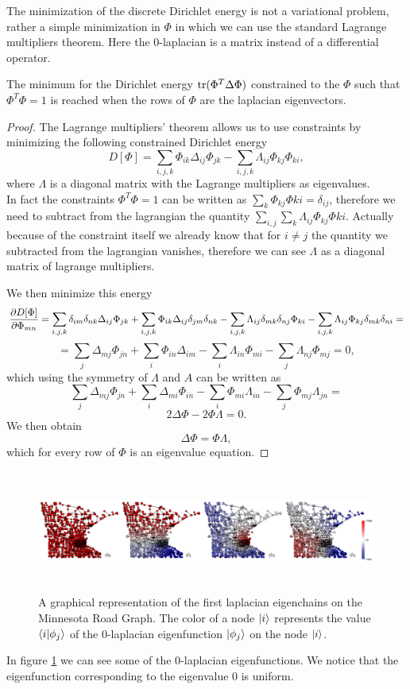 \documentclass[../2.tex]{subfiles}
\begin{document}
The minimization of the discrete Dirichlet energy is not a variational problem, rather a simple minimization in $\Phi$ in which we can 
use the standard Lagrange multipliers theorem. Here the $0$-laplacian is a matrix instead of a differential operator. 
\begin{prop}
    The minimum for the Dirichlet energy $ \operatorname{tr}(\Phi^T \Delta \Phi)$ constrained to the $\Phi$ such that $\Phi^T \Phi = 1$ is reached when the
    rows of $\Phi$ are the laplacian eigenvectors.
\end{prop}
\begin{proof}
    The Lagrange multipliers' theorem allows us to use constraints by minimizing the following constrained Dirichlet energy
    \[ D[\Phi] = \sum_{i,j,k} \Phi_{ik} \Delta_{ij} \Phi_{jk} - \sum_{i,j,k} \Lambda_{ij} \Phi_{kj} \Phi_{ki}, \]
    where $\Lambda$ is a diagonal matrix with the Lagrange multipliers as eigenvalues.\\
    In fact the constraints $\Phi^T \Phi = 1$ can be written as $\sum_k \Phi_{kj} \Phi{ki} = \delta_{ij}$, therefore we need to subtract from the lagrangian
    the quantity $\sum_{i,j} \sum_k \Lambda_{ij} \Phi_{kj} \Phi{ki}$. Actually because of the constraint itself we already know that for $i \neq j$ the quantity
    we subtracted from the lagrangian vanishes, therefore we can see $\Lambda$ as a diagonal matrix of lagrange multipliers.  

    We then minimize this energy
    \[ \frac{\partial D[\Phi]}{\partial \Phi_{mn}} = \sum_{i,j,k} \delta_{im}\delta_{nk}\Delta_{ij} \Phi_{jk} + \sum_{i,j,k} \Phi_{ik} \Delta_{ij}\delta_{jm}\delta_{nk}
    - \sum_{i,j,k} \Lambda_{ij} \delta_{mk}\delta_{nj}\Phi_{ki} - \sum_{i,j,k} \Lambda_{ij} \Phi_{kj} \delta_{mk}\delta_{ni} =  \]
    \[ = \sum_{j} \Delta_{mj} \Phi_{jn} + \sum_{i} \Phi_{in} \Delta_{im} - \sum_{i} \Lambda_{in} \Phi_{mi} - \sum_{j} \Lambda_{nj} \Phi_{mj} = 0, \]
    which using the symmetry of $\Lambda$ and $A$ can be written as
    \[ \sum_{j} \Delta_{mj} \Phi_{jn} + \sum_{i}  \Delta_{mi} \Phi_{in} - \sum_{i} \Phi_{mi}\Lambda_{in} - \sum_{j} \Phi_{mj} \Lambda_{jn} =  \]
    \[ 2\Delta\Phi - 2\Phi\Lambda = 0. \]
    We then obtain 
    \[ \Delta\Phi = \Phi\Lambda, \]
    which for every row of $\Phi$ is an eigenvalue equation. \qedhere
\end{proof}

\begin{figure}[H]
    \centering
    \includegraphics[width=17cm, height=4cm]{sections/2/eiglap}
    \caption{A graphical representation of the first laplacian eigenchains on the Minnesota Road Graph.
    The color of a node $| i \rangle$ represents the value $\langle i | \phi_j \rangle$ of the $0$-laplacian eigenfunction $| \phi_j \rangle$
    on the node $| i \rangle$.}
    \label{fig:2:5}
\end{figure}

In figure \ref{fig:2:5} we can see some of the $0$-laplacian eigenfunctions. We notice that the eigenfunction corresponding to the eigenvalue $0$ is uniform.
   
\end{document}
